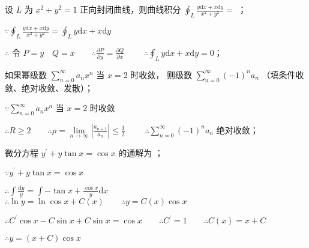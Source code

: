 \begin{question}[points = 3]
    设 $L$ 为 $x^2 + y^2 = 1$ 正向封闭曲线，则曲线积分 $\oint_L \frac{y\mathrm{d}x + x\mathrm{d}y}{x^2 + y^2} = $ \fillin[$0$]；
\end{question}
\begin{solution}
    $\because \oint_L \frac{y\mathrm{d}x + x\mathrm{d}y}{x^2 + y^2} = \oint_L y\mathrm{d}x + x\mathrm{d}y$

    $\therefore$ 令 $P = y \quad Q = x \qquad \therefore \frac{\partial P}{\partial y} = \frac{\partial Q}{\partial x} \qquad$
    $\therefore \oint_L y\mathrm{d}x + x\mathrm{d}y = 0$；
\end{solution}

\begin{question}[points = 3]
    如果幂级数 $\sum\limits_{n = 0}^{\infty} a_nx^n$ 当 $x = 2$ 时收敛，
    则级数 $\sum\limits_{n = 0}^{\infty} (-1)^na_n$ \fillin[绝对收敛] （填条件收敛、绝对收敛、发散）；
\end{question}
\begin{solution}
    $\because \sum\limits_{n = 0}^{\infty} a_nx^n$ 当 $x = 2$ 时收敛

    $\therefore R \geq 2 \qquad \therefore \rho = \lim\limits_{n \to \infty} \left|\frac{a_{n + 1}}{a_n}\right| \leq \frac{1}{2} \qquad$
    $\therefore \sum\limits_{n = 0}^{\infty} (-1)^na_n$ 绝对收敛；
\end{solution}

\begin{question}[points = 3]
    微分方程 $y^{\prime} + y\tan{x} = \cos{x}$ 的通解为 \fillin[$y = (x + C)\cos{x}$]；
\end{question}
\begin{solution}
    $\because y^{\prime} + y\tan{x} = \cos{x}$

    $\therefore \int \frac{\mathrm{d}y}{y} = \int -\tan{x} + \frac{\cos{x}}{y}\mathrm{d}x \qquad$
    $\therefore \ln{y} = \ln{\cos{x}} + C(x) \qquad \therefore y = C(x)\cos{x}$

    $\therefore C^{\prime}\cos{x} - C\sin{x} + C\sin{x} = \cos{x} \qquad \therefore C^{\prime} = 1 \qquad \therefore C(x) = x + C$

    $\therefore y = (x + C)\cos{x}$
\end{solution}

